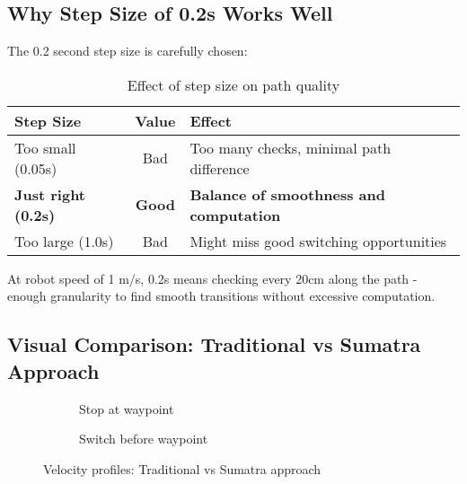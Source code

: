 \documentclass[12pt,a4paper]{article}
\begin{document}
\subsection{Why Step Size of 0.2s Works Well}

The 0.2 second step size is carefully chosen:

\begin{table}[h]
\centering
\begin{tabular}{|l|c|p{6cm}|}
\hline
\textbf{Step Size} & \textbf{Value} & \textbf{Effect} \\
\hline
Too small (0.05s) & Bad & Too many checks, minimal path difference \\
\textbf{Just right (0.2s)} & \textbf{Good} & \textbf{Balance of smoothness and computation} \\
Too large (1.0s) & Bad & Might miss good switching opportunities \\
\hline
\end{tabular}
\caption{Effect of step size on path quality}
\end{table}

At robot speed of 1 m/s, 0.2s means checking every 20cm along the path - enough granularity to find smooth transitions without excessive computation.

\subsection{Visual Comparison: Traditional vs Sumatra Approach}

\begin{figure}[H]
\centering
\begin{subfigure}{0.45\textwidth}
\caption{Stop at waypoint}
\end{subfigure}
\hfill
\begin{subfigure}{0.45\textwidth}
\caption{Switch before waypoint}
\end{subfigure}
\caption{Velocity profiles: Traditional vs Sumatra approach}
\end{figure}
\end{document}
